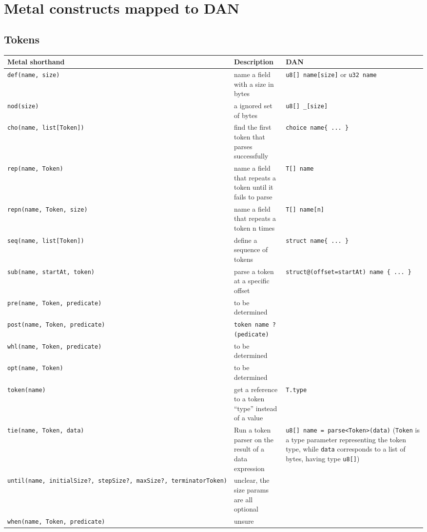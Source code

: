 \documentclass[10pt,oneside]{article}
\begin{document}
\hypertarget{metal-constructs-mapped-to-dan}{%
\section{Metal constructs mapped to
DAN}\label{metal-constructs-mapped-to-dan}}

\hypertarget{tokens}{%
\subsection{Tokens}\label{tokens}}

\renewcommand*{\arraystretch}{1.4}
\begin{longtable}[]{@{}p{5cm} p{4.5cm} p{5.5cm}@{}}
\toprule
Metal shorthand & Description & DAN\tabularnewline
\midrule
\endhead
\texttt{def(name,\ size)} & name a field with a size in bytes &
\texttt{u8{[}{]}\ name{[}size{]}} or \texttt{u32\ name}\tabularnewline
\texttt{nod(size)} & a ignored set of bytes &
\texttt{u8{[}{]}\ \_{[}size{]}}\tabularnewline
\texttt{cho(name,\ list{[}Token{]})} & find the first token that parses
successfully & \texttt{choice\ name\{\ ...\ \}}\tabularnewline
\texttt{rep(name,\ Token)} & name a field that repeats a token until it
fails to parse & \texttt{T{[}{]}\ name}\tabularnewline
\texttt{repn(name,\ Token,\ size)} & name a field that repeats a token n
times & \texttt{T{[}{]}\ name{[}n{]}}\tabularnewline
\texttt{seq(name,\ list{[}Token{]})} & define a sequence of tokens &
\texttt{struct\ name\{\ ...\ \}}\tabularnewline
\texttt{sub(name,\ startAt,\ token)} & parse a token at a specific
offset &
\texttt{struct@(offset=startAt)\ name\ \{\ ...\ \}}\tabularnewline
\texttt{pre(name,\ Token,\ predicate)} & to be determined
&\tabularnewline
\texttt{post(name,\ Token,\ predicate)} &
\texttt{token\ name\ ?(pedicate)} &\tabularnewline
\texttt{whl(name,\ Token,\ predicate)} & to be determined
&\tabularnewline
\texttt{opt(name,\ Token)} & to be determined &\tabularnewline
\texttt{token(name)} & get a reference to a token ``type'' instead of a
value & \texttt{T.type}\tabularnewline
\texttt{tie(name,\ Token,\ data)} & Run a token parser on the result of
a data expression &
\texttt{u8{[}{]}\ name\ =\ parse\textless{}Token\textgreater{}(data)}
(\texttt{Token} is a type parameter representing the token type, while
\texttt{data} corresponds to a list of bytes, having type
\texttt{u8{[}{]}})\tabularnewline
\texttt{until(name,\ initialSize?,\ stepSize?,\ maxSize?,\ terminatorToken)}
& unclear, the size params are all optional &\tabularnewline
\texttt{when(name,\ Token,\ predicate)} & unsure &\tabularnewline
\bottomrule
\end{longtable}
\end{document}
